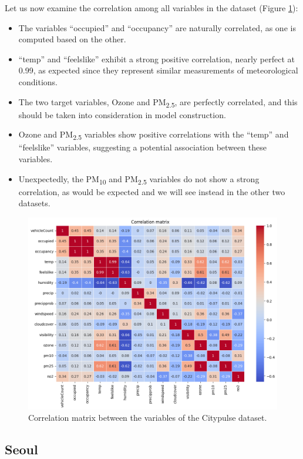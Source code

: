 Let us now examine the correlation among all variables in the dataset (Figure \ref{fig:corr_matrix_citypulse}):
\begin{itemize}

    \item The variables ``occupied'' and ``occupancy'' are naturally correlated, as one is computed based on the other.
    \item ``temp'' and ``feelslike'' exhibit a strong positive correlation, nearly perfect at 0.99, as expected since they represent similar measurements of meteorological conditions.
    \item The two target variables, Ozone and PM\textsubscript{2.5}, are perfectly correlated, and this should be taken into consideration in model construction.
    \item Ozone and PM\textsubscript{2.5} variables show positive correlations with the ``temp'' and ``feelslike'' variables, suggesting a potential association between these variables.
    \item Unexpectedly, the PM\textsubscript{10} and PM\textsubscript{2.5} variables do not show a strong correlation, as would be expected and we will see instead in the other two datasets.
\end{itemize}

\begin{figure}[h]
    \centering
    \includegraphics[width=0.75\linewidth]{images/corr_matrix_citypulse.png}
    \caption{Correlation matrix between the variables of the Citypulse dataset.}
    \label{fig:corr_matrix_citypulse}
\end{figure}

\newpage
\subsection{Seoul}

